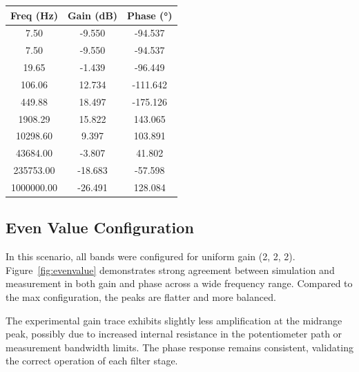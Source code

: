 \documentclass[12pt]{article}
\begin{document}
\begin{center}
	\begin{tabular}{|c|c|c|}
		\hline
		\textbf{Freq (Hz)} & \textbf{Gain (dB)} & \textbf{Phase (°)} \\
		\hline
		7.50               & -9.550             & -94.537            \\
		7.50               & -9.550             & -94.537            \\
		19.65              & -1.439             & -96.449            \\
		106.06             & 12.734             & -111.642           \\
		449.88             & 18.497             & -175.126           \\
		1908.29            & 15.822             & 143.065            \\
		10298.60           & 9.397              & 103.891            \\
		43684.00           & -3.807             & 41.802             \\
		235753.00          & -18.683            & -57.598            \\
		1000000.00         & -26.491            & 128.084            \\
		\hline
	\end{tabular}
\end{center}

\subsection{Even Value Configuration}

In this scenario, all bands were configured for uniform gain (2, 2, 2). Figure~\ref{fig:evenvalue} demonstrates strong agreement between simulation and measurement in both gain and phase across a wide frequency range. Compared to the max configuration, the peaks are flatter and more balanced.

The experimental gain trace exhibits slightly less amplification at the midrange peak, possibly due to increased internal resistance in the potentiometer path or measurement bandwidth limits. The phase response remains consistent, validating the correct operation of each filter stage.
\end{document}
